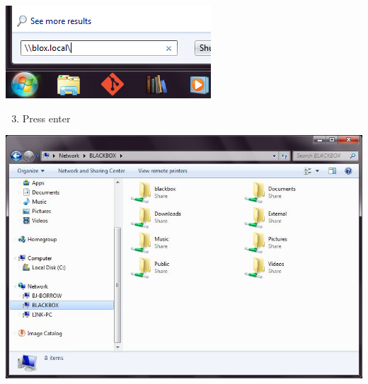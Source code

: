 \documentclass[letterpaper,10pt,english]{sphinxmanual}
\begin{document}
\includegraphics{hostname-windows.png}
\begin{enumerate}
\setcounter{enumi}{2}
\item {} 
Press enter

\end{enumerate}

\includegraphics{folder-windows.png}
\end{document}
